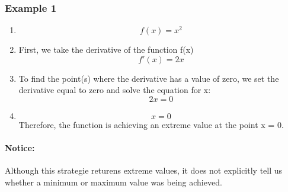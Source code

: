 \documentclass[a4paper,11pt]{book}
\begin{document}
\subsubsection{Example 1}
\begin{enumerate}
  \LARGE
  \item \[ f(x) = x^2 \]
  \item \normalsize First, we take the derivative of the function f(x) \LARGE \[ f'(x) = 2x \]
  \item \normalsize To find the point(s) where the derivative has a value of zero, we set the derivative equal to zero and solve the equation for x: \LARGE \[ 2x = 0 \]
  \item \[ x = 0 \]
\normalsize  
Therefore, the function is achieving an extreme value at the point x = 0.
\end{enumerate}

\paragraph{Notice:}
Although this strategie returens extreme values, it does not explicitly tell us whether a minimum or maximum value was being achieved.
\end{document}
